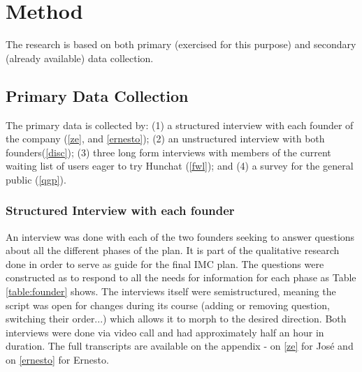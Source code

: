 \documentclass[12pt]{article}
\begin{document}
\pagebreak
\section{Method}\label{method}
The research is based on both primary (exercised for this purpose) and secondary (already available) data collection. 

\subsection{Primary Data Collection}
The primary data is collected by: (1) a structured interview with each founder of the company (\ref{ze}, and \ref{ernesto}); (2) an unstructured interview with both founders(\ref{disc}); (3) three long form interviews with members of the current waiting list of users eager to try Hunchat (\ref{fwl}); and (4) a survey for the general public (\ref{qgp}). 

\subsubsection{Structured Interview with each founder}
An interview was done with each of the two founders seeking to answer questions about all the different phases of the plan. It is part of the qualitative research done in order to serve as guide for the final IMC plan. The questions were constructed as to respond to all the needs for information for each phase as Table \ref{table:founder} shows. The interviews itself were semistructured, meaning the script was open for changes during its course (adding or removing question, switching their order...) which allows it to morph to the desired direction. Both interviews were done via video call and had approximately half an hour in duration. The full transcripts are available on the appendix - on \ref{ze} for José and on \ref{ernesto} for Ernesto. 
\end{document}
